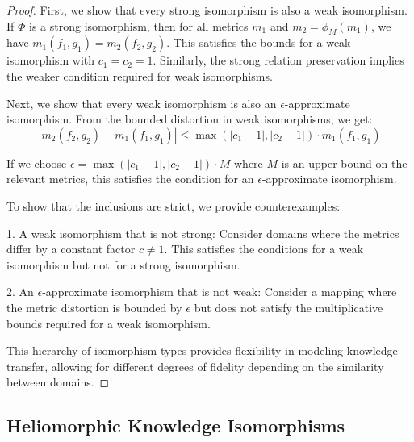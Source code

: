 \begin{proof}
First, we show that every strong isomorphism is also a weak isomorphism. If $\Phi$ is a strong isomorphism, then for all metrics $m_1$ and $m_2 = \phi_M(m_1)$, we have $m_1(f_1, g_1) = m_2(f_2, g_2)$. This satisfies the bounds for a weak isomorphism with $c_1 = c_2 = 1$. Similarly, the strong relation preservation implies the weaker condition required for weak isomorphisms.

Next, we show that every weak isomorphism is also an $\epsilon$-approximate isomorphism. From the bounded distortion in weak isomorphisms, we get:
\begin{equation}
|m_2(f_2, g_2) - m_1(f_1, g_1)| \leq \max(|c_1 - 1|, |c_2 - 1|) \cdot m_1(f_1, g_1)
\end{equation}

If we choose $\epsilon = \max(|c_1 - 1|, |c_2 - 1|) \cdot M$ where $M$ is an upper bound on the relevant metrics, this satisfies the condition for an $\epsilon$-approximate isomorphism.

To show that the inclusions are strict, we provide counterexamples:

1. A weak isomorphism that is not strong: Consider domains where the metrics differ by a constant factor $c \neq 1$. This satisfies the conditions for a weak isomorphism but not for a strong isomorphism.

2. An $\epsilon$-approximate isomorphism that is not weak: Consider a mapping where the metric distortion is bounded by $\epsilon$ but does not satisfy the multiplicative bounds required for a weak isomorphism.

This hierarchy of isomorphism types provides flexibility in modeling knowledge transfer, allowing for different degrees of fidelity depending on the similarity between domains.
\end{proof}

\subsection{Heliomorphic Knowledge Isomorphisms}

